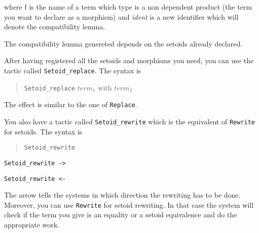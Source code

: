 \noindent where f is the name of a term which type is a non dependent
product (the term you want to declare as a morphism) and
\textit{ident} is a new identifier which will denote the
compatibility lemma.

\begin{ErrMsgs}
\item {}
\item {}
\item {}
\end{ErrMsgs}

The compatibility lemma genereted depends on the setoids already
declared.


After having registered all the setoids and morphisms you need, you can
use the tactic called \texttt{Setoid\_replace}. The syntax is

\begin{quotation}
\texttt{Setoid\_replace} $ term_1$ with $term_2$
\end{quotation}

The effect is similar to the one of \texttt{Replace}.

You also have a tactic called \texttt{Setoid\_rewrite} which is the
equivalent of \texttt{Rewrite} for setoids. The syntax is 

\begin{quotation}
\texttt{Setoid\_rewrite} \term
\end{quotation}

\begin{Variants}
 \item \texttt{Setoid\_rewrite ->} \term
 \item \texttt{Setoid\_rewrite <-} \term
\end{Variants}

The arrow tells the systems in which direction the rewriting has to be
done. Moreover, you can use \texttt{Rewrite} for setoid
rewriting. In that case the system will check if the term you give is
an equality or a setoid equivalence and do the appropriate work.

